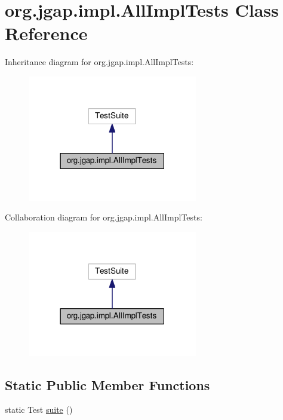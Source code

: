 \hypertarget{classorg_1_1jgap_1_1impl_1_1_all_impl_tests}{\section{org.\-jgap.\-impl.\-All\-Impl\-Tests Class Reference}
\label{classorg_1_1jgap_1_1impl_1_1_all_impl_tests}
}


Inheritance diagram for org.\-jgap.\-impl.\-All\-Impl\-Tests\-:
\nopagebreak
\begin{figure}[H]
\begin{center}
\leavevmode
\includegraphics[width=210pt]{classorg_1_1jgap_1_1impl_1_1_all_impl_tests__inherit__graph}
\end{center}
\end{figure}


Collaboration diagram for org.\-jgap.\-impl.\-All\-Impl\-Tests\-:
\nopagebreak
\begin{figure}[H]
\begin{center}
\leavevmode
\includegraphics[width=210pt]{classorg_1_1jgap_1_1impl_1_1_all_impl_tests__coll__graph}
\end{center}
\end{figure}
\subsection*{Static Public Member Functions}
\begin{DoxyCompactItemize}
\item 
static Test \hyperlink{classorg_1_1jgap_1_1impl_1_1_all_impl_tests_afdbafb348613088370e16527bcde7ddc}{suite} ()
\end{DoxyCompactItemize}
